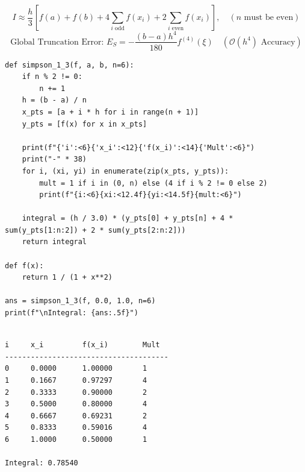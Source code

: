 \documentclass[10pt,a4paper]{report}
\begin{document}
\begin{tcolorbox}[colback=theorybg,colframe=theoryframe,title=\textbf{Mathematical Theory \& Formulation},boxrule=1pt,arc=2mm]
\[
I \approx \frac{h}{3}\left[f(a) + f(b) + 4 \sum_{i \text{ odd}} f(x_i) + 2 \sum_{i \text{ even}} f(x_i)\right], \quad (n \text{ must be even})
\]
\[
\text{Global Truncation Error: } E_S = -\frac{(b - a) h^4}{180} f^{(4)}(\xi) \quad (\mathcal{O}(h^4) \text{ Accuracy})
\]
\end{tcolorbox}

\begin{tcolorbox}[colback=codebg,colframe=secondary,title=\textbf{Python Implementation (Step-by-Step Functions)},boxrule=1pt,arc=2mm]
\begin{lstlisting}[style=python_detailed]
def simpson_1_3(f, a, b, n=6):
    if n % 2 != 0:
        n += 1
    h = (b - a) / n
    x_pts = [a + i * h for i in range(n + 1)]
    y_pts = [f(x) for x in x_pts]

    print(f"{'i':<6}{'x_i':<12}{'f(x_i)':<14}{'Mult':<6}")
    print("-" * 38)
    for i, (xi, yi) in enumerate(zip(x_pts, y_pts)):
        mult = 1 if i in (0, n) else (4 if i % 2 != 0 else 2)
        print(f"{i:<6}{xi:<12.4f}{yi:<14.5f}{mult:<6}")

    integral = (h / 3.0) * (y_pts[0] + y_pts[n] + 4 * sum(y_pts[1:n:2]) + 2 * sum(y_pts[2:n:2]))
    return integral

def f(x):
    return 1 / (1 + x**2)

ans = simpson_1_3(f, 0.0, 1.0, n=6)
print(f"\nIntegral: {ans:.5f}")


\end{lstlisting}
\end{tcolorbox}

\begin{tcolorbox}[colback=termbg,colframe=primary,title=\textbf{Program Execution Output \& Convergence Table},boxrule=1pt,arc=2mm]
\begin{lstlisting}[style=terminal_output]
i     x_i         f(x_i)        Mult  
--------------------------------------
0     0.0000      1.00000       1     
1     0.1667      0.97297       4     
2     0.3333      0.90000       2     
3     0.5000      0.80000       4     
4     0.6667      0.69231       2     
5     0.8333      0.59016       4     
6     1.0000      0.50000       1     

Integral: 0.78540
\end{lstlisting}
\end{tcolorbox}
\end{document}
